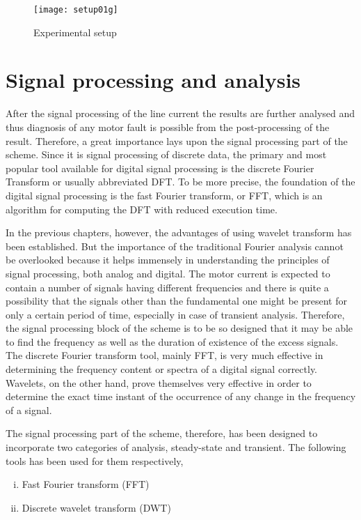 \documentclass[a4paper,11pt]{report}
\begin{document}
\begin{figure}[h]
\centering
\texttt{[image: setup01g]}
\caption{Experimental setup} \label{setup01g}
\end{figure}

\section{Signal processing and analysis}
After the signal processing of the line current the results are further analysed and thus diagnosis of any motor fault is possible from the post-processing of the result. Therefore, a great importance lays upon the signal processing part of the scheme. Since it is signal processing of discrete data, the primary and most popular tool available for digital signal processing is the discrete Fourier Transform or usually abbreviated DFT. To be more precise, the foundation of the digital signal processing is the fast Fourier transform, or FFT, which is an algorithm for computing the DFT with reduced execution time. 

In the previous chapters, however, the advantages of using wavelet transform has been established. But the importance of the traditional Fourier analysis cannot be overlooked because it helps immensely in understanding the principles of signal processing, both analog and digital. The motor current is expected to contain a number of signals having different frequencies and there is quite a possibility that the signals other than the fundamental one might be present for only a certain period of time, especially in case of transient analysis. Therefore, the signal processing block of the scheme is to be so designed that it may be able to find the frequency as well as the duration of existence of the excess signals. The discrete Fourier transform tool, mainly FFT, is very much effective in determining the frequency content or spectra of a digital signal correctly. Wavelets, on the other hand, prove themselves very effective in order to determine the exact time instant of the occurrence of any change in the frequency of a signal.

The signal processing part of the scheme, therefore, has been designed to incorporate two categories of analysis, steady-state and transient. The following tools has been used for them respectively,
\begin{enumerate}[(i)]
\item Fast Fourier transform (FFT)
\item Discrete wavelet transform (DWT)
\end{enumerate}
\end{document}
